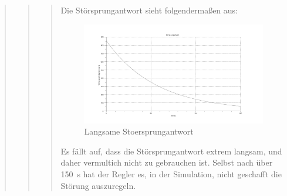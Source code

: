 \begin{quote}
\begin{quote}
\begin{quote}
            Die Störsprungantwort sieht folgendermaßen aus:
            \begin{figure}[H]
                \centering
                    \includegraphics[scale=0.5, trim = 0cm 0cm 0cm 0cm, clip]{./Bilder/Stoersprungantwortlangsam}
                        \caption{Langsame Stoersprungantwort}
                        \label{fig:filename}
            \end{figure}
    
            Es fällt auf, dass die Störsprungantwort extrem langsam, und daher vermultich nicht zu gebrauchen ist. Selbst
            nach über \SI{150}{s} hat der Regler es, in der Simulation, nicht geschafft die Störung auszuregeln.\vspace{1em}
             

\end{quote}
\end{quote}
\end{quote}

